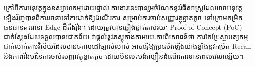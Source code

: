 \begin{khmer}
ក្រៅពីការអនុវត្តក្នុងឧស្សាហកម្មដោយផ្ទាល់ ការងារនេះបានរួមចំណែកនូវវិធីសាស្ត្រដែលអាចអនុវត្តឡើងវិញបានពីការរចនាទៅការដាក់ឱ្យដំណើរការ សម្រាប់ការចាប់សញ្ញាវត្ថុខ្នាតតូច នៅក្រោមកម្រិតធនធានគណនា Edge ដ៏តឹងរ៉ឹង។ ដោយត្រូវបានផ្ទៀងផ្ទាត់តាមរយៈ \textenglish{Proof of Concept (PoC)} ជាក់ស្តែងដែលទទួលបានជោគជ័យ វាផ្តល់នូវភស្តុតាងតាមរយៈការពិសោធន៍ថា ការកែប្រែស្ថាបត្យកម្មជាក់លាក់តាមវិស័យដែលមានគោលដៅច្បាស់លាស់ អាចធ្វើឱ្យប្រសើរឡើងយ៉ាងខ្លាំងនូវកម្រិត \textenglish{Recall} និងភាពរឹងមាំនៃការចាប់សញ្ញាវត្ថុខ្នាតតូច ដោយមិនលះបង់ល្បឿនដំណើរការទាន់ពេលវេលាឡើយ។
\end{khmer}
